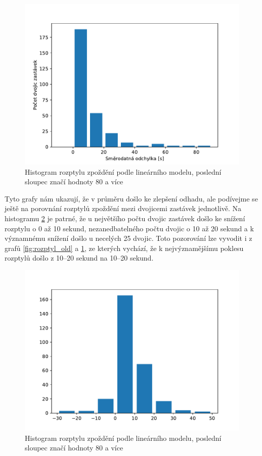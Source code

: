 \begin{figure}
   \centering
 \includegraphics[width=1\linewidth]{../img/rozptyl_new}
 \caption{Histogram rozptylu zpoždění podle lineárního modelu, poslední sloupec značí hodnoty 80 a více}
 \label{fig:rozptyl_new}
\end{figure}


\bigbreak


Tyto grafy nám ukazují, že v průměru došlo ke zlepšení odhadu, ale podívejme se ještě na porovnání rozptylů zpoždění mezi dvojicemi zastávek jednotlivě. Na histogramu \ref{fig:rozptyl_diff} je patrné, že u největšího počtu dvojic zastávek došlo ke snížení rozptylu o 0 až 10 sekund, nezanedbatelného počtu dvojic o 10 až 20 sekund a k významnému snížení došlo u necelých 25 dvojic. Toto pozorování lze vyvodit i z grafů \ref{fig:rozptyl_old} a \ref{fig:rozptyl_new}, ze kterých vychází, že k nejvýznamějšímu poklesu rozptylů došlo z 10--20 sekund na 10--20 sekund.


\begin{figure}
   \centering
 \includegraphics[width=1\linewidth]{../img/rozptyl_diff}
 \caption{Histogram rozptylu zpoždění podle lineárního modelu, poslední sloupec značí hodnoty 80 a více}
 \label{fig:rozptyl_diff}
\end{figure}



